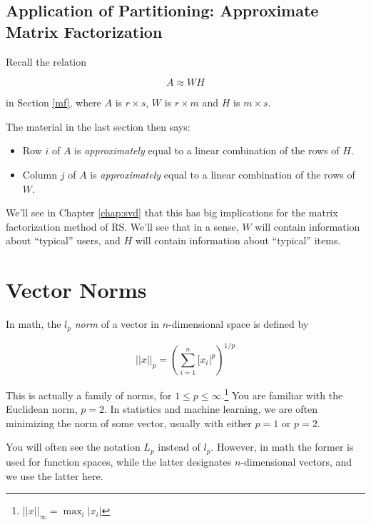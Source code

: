 \subsection{Application of Partitioning:  Approximate Matrix Factorization}
\label{mfact}

Recall the relation 

\begin{equation}
A \approx WH
\end{equation}

in Section \ref{mf}, where $A$ is $r \times s$, $W$ is $r \times m$ and
$H$ is $m \times s$.  

The material in the last section then says:

\begin{itemize}

\item Row $i$ of $A$ is \textit{approximately} equal to a linear
combination of the rows of $H$.

\item Column $j$ of $A$ is \textit{approximately} equal to a linear
combination of the rows of $W$.

\end{itemize} 

We'll see in Chapter \ref{chap:svd} that this has big implications for
the matrix factorization method of RS.  We'll see that in a sense, $W$
will contain information about ``typical'' users, and $H$ will contain
information about ``typical'' items.

\section{Vector Norms}
\label{vecnorms}

In math, the $l_p$ \textit{norm} of a vector in $n$-dimensional space is
defined by

\begin{equation}
||x||_p = \left ( \sum_{i=1}^n [x_i|^p \right )^{1/p}
\end{equation}

This is actually a family of norms, for $1 \leq p \leq
\infty$.\footnote{$||x||_{\infty} = \max_i |x_i|$} You are familiar with
the Euclidean norm, $p = 2$.  In statistics and machine learning, we are
often minimizing the norm of some vector, usually with either $p = 1$ or
$p = 2$.

You will often see the notation $L_p$ instead of $l_p$.  However, in
math the former is used for function spaces, while the latter designates
$n$-dimensional vectors, and we use the latter here.

